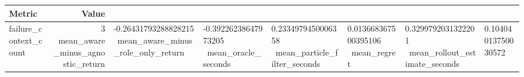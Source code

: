 \begin{tabular}{lr}
\hline
Metric & Value \\
\hline
failure\_context\_count & 3 \
mean\_aware\_minus\_agnostic\_return & -0.26431793288828215 \
mean\_aware\_minus\_role\_only\_return & -0.39226238647973205 \
mean\_oracle\_seconds & 0.2334979450006358 \
mean\_particle\_filter\_seconds & 0.013668367500395106 \
mean\_regret & 0.3299792031322201 \
mean\_rollout\_estimate\_seconds & 0.10404013750030572 \
\hline
\end{tabular}
